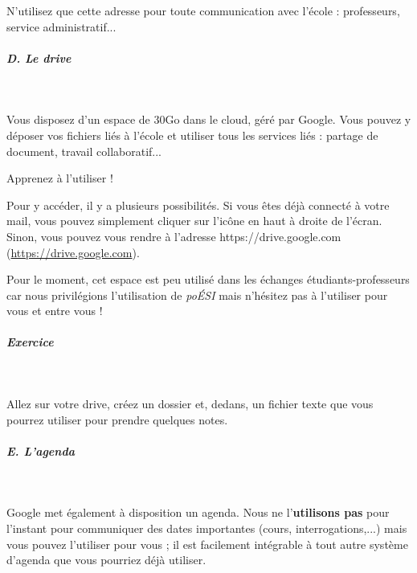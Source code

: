 \documentclass[11pt,a4paper]{article}
\begin{document}
            \par
        
				N'utilisez que cette adresse 
				pour toute communication avec l'\'ecole :
				professeurs, service administratif...
			
            \par
        
			
		\subparagraph{D. Le drive} 
		
					\textcolor{white}{.} \par
				
				Vous disposez d'un espace de 30Go dans le cloud,
				g\'er\'e par Google.		
				Vous pouvez y d\'eposer vos fichiers li\'es \`a l'\'ecole
				et utiliser tous les services li\'es :
				partage de document,
				travail collaboratif...
				
				Apprenez \`a l'utiliser !
			
            \par
        
				Pour y acc\'eder,
				il y a plusieurs possibilit\'es.
				Si vous \^etes d\'ej\`a connect\'e \`a votre mail,
				vous pouvez simplement cliquer
				sur l'ic\^one en haut \`a droite de l'\'ecran.
				Sinon, 
				vous pouvez vous rendre \`a l'adresse
				https://drive.google.com (\url{https://drive.google.com}).
			
            \par
        
				Pour le moment,
				cet espace est peu utilis\'e dans les \'echanges
				\'etudiants-professeurs car nous privil\'egions
				l'utilisation de \textit{po\'ESI}
				mais n'h\'esitez pas \`a l'utiliser pour vous
				et entre vous !
			
            \par
        
			
		\subparagraph{Exercice} 
		
					\textcolor{white}{.} \par
				
				Allez sur votre drive,
				cr\'eez un dossier \verb@Java@
				et, dedans, un fichier texte
				\verb@Notes@
				que vous pourrez utiliser pour prendre quelques notes.
			
            \par
        
			
		\subparagraph{E. L'agenda} 
		
					\textcolor{white}{.} \par
				
				Google met \'egalement \`a disposition un agenda.
				Nous ne l'\textbf{utilisons pas}
				pour l'instant
				pour communiquer des dates importantes
				(cours, interrogations,...)
				mais vous pouvez l'utiliser pour vous ;
				il est facilement int\'egrable \`a
				tout autre syst\`eme d'agenda que vous pourriez
				d\'ej\`a utiliser.
			
\end{document}
